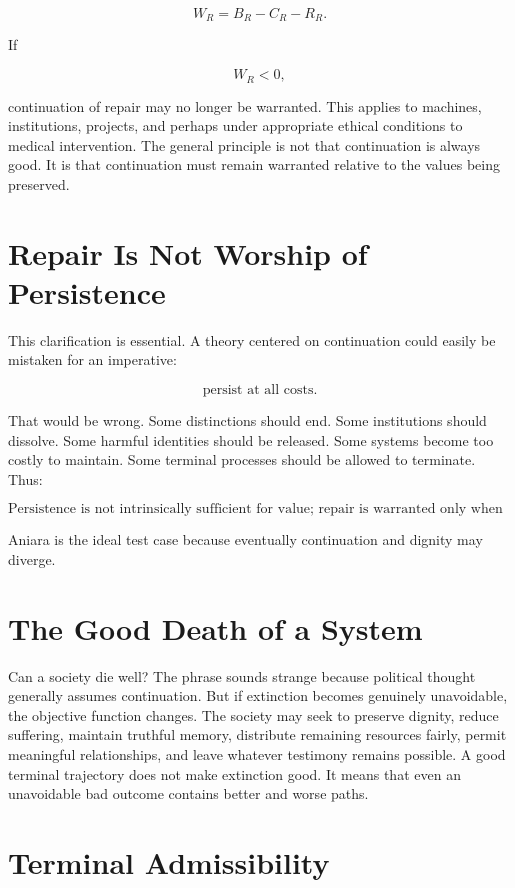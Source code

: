 \documentclass[11pt,oneside]{book}
\theoremstyle{definition}
\theoremstyle{remark}
\begin{document}
\[
W_R = B_R-C_R-R_R.
\]

If

\[
W_R<0,
\]

continuation of repair may no longer be warranted. This applies to machines, institutions, projects,
and perhaps under appropriate ethical conditions to medical intervention. The general principle is
not that continuation is always good. It is that continuation must remain warranted relative to the
values being preserved.

\section{Repair Is Not Worship of Persistence}

This clarification is essential. A theory centered on continuation could easily be mistaken for an
imperative:

\[
\text{persist at all costs}.
\]

That would be wrong. Some distinctions should end. Some institutions should dissolve. Some harmful
identities should be released. Some systems become too costly to maintain. Some terminal processes
should be allowed to terminate. Thus:

\[
\boxed{ \text{Persistence is not intrinsically sufficient for value; repair is warranted only when the distinction being preserved and the means of preserving it remain admissible.} }
\]

Aniara is the ideal test case because eventually continuation and dignity may diverge.

\section{The Good Death of a System}

Can a society die well? The phrase sounds strange because political thought generally assumes
continuation. But if extinction becomes genuinely unavoidable, the objective function changes. The
society may seek to preserve dignity, reduce suffering, maintain truthful memory, distribute
remaining resources fairly, permit meaningful relationships, and leave whatever testimony remains
possible. A good terminal trajectory does not make extinction good. It means that even an
unavoidable bad outcome contains better and worse paths.

\section{Terminal Admissibility}
\end{document}
